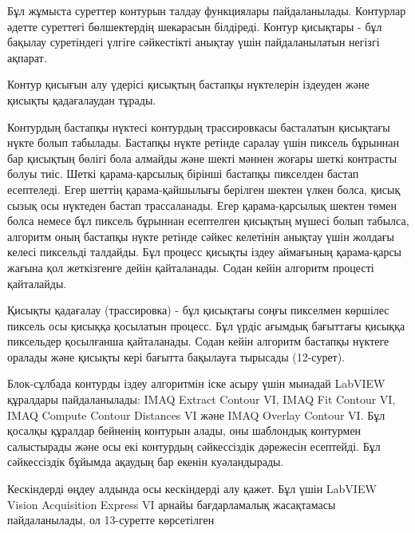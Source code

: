 \begin{multicols}{2}
Бұл жұмыста суреттер контурын талдау функциялары пайдаланылады.
Контурлар әдетте суреттегі бөлшектердің шекарасын білдіреді. Контур
қисықтары - бұл бақылау суретіндегі үлгіге сәйкестікті анықтау үшін
пайдаланылатын негізгі ақпарат.

Контур қисығын алу үдерісі қисықтың бастапқы нүктелерін іздеуден және
қисықты қадағалаудан тұрады.

Контурдың бастапқы нүктесі контурдың трассировкасы басталатын қисықтағы
нүкте болып табылады. Бастапқы нүкте ретінде саралау үшін пиксель
бұрыннан бар қисықтың бөлігі бола алмайды және шекті мәннен жоғары шеткі
контрасты болуы тиіс. Шеткі қарама-қарсылық бірінші бастапқы пикселден
бастап есептеледі. Егер шеттің қарама-қайшылығы берілген шектен үлкен
болса, қисық сызық осы нүктеден бастап трассаланады. Егер
қарама-қарсылық шектен төмен болса немесе бұл пиксель бұрыннан
есептелген қисықтың мүшесі болып табылса, алгоритм оның бастапқы нүкте
ретінде сәйкес келетінін анықтау үшін жолдағы келесі пиксельді талдайды.
Бұл процесс қисықты іздеу аймағының қарама-қарсы жағына қол жеткізгенге
дейін қайталанады. Содан кейін алгоритм процесті қайталайды.

Қисықты қадағалау (трассировка) - бұл қисықтағы соңғы пикселмен көршілес
пиксель осы қисыққа қосылатын процесс. Бұл үрдіс ағымдық бағыттағы
қисыққа пиксельдер қосылғанша қайталанады. Содан кейін алгоритм бастапқы
нүктеге оралады және қисықты кері бағытта бақылауға тырысады (12-сурет).

Блок-сұлбада контурды іздеу алгоритмін іске асыру үшін мынадай LabVIEW
құралдары пайдаланылады: IMAQ Extract Contour VI, IMAQ Fit Contour VI,
IMAQ Compute Contour Distances VI және IMAQ Overlay Contour VI. Бұл
қосалқы құралдар бейненің контурын алады, оны шаблондық контурмен
салыстырады және осы екі контурдың сәйкессіздік дәрежесін есептейді. Бұл
сәйкессіздік бұйымда ақаудың бар екенін куәландырады.

Кескіндерді өңдеу алдында осы кескіндерді алу қажет. Бұл үшін LabVIEW
Vision Acquisition Express VI арнайы бағдарламалық жасақтамасы
пайдаланылады, ол 13-суретте көрсетілген
\end{multicols}

